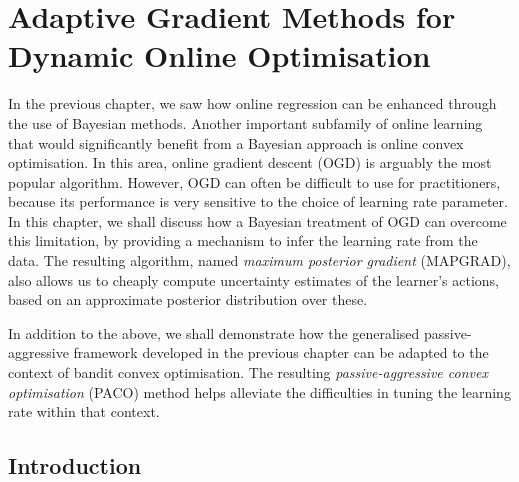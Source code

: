 \chapter{Adaptive Gradient Methods for Dynamic Online Optimisation}
\label{ch:oo}

\minitoc


In the previous chapter, we saw how online regression can be enhanced through the use of Bayesian methods. Another important subfamily of online learning that would significantly benefit from a Bayesian approach is online convex optimisation. In this area, online gradient descent (OGD) is arguably the most popular algorithm. However, OGD can often be difficult to use for practitioners, because its performance is very sensitive to the choice of learning rate parameter. In this chapter, we shall discuss how a Bayesian treatment of OGD can overcome this limitation, by providing a mechanism to infer the learning rate from the data. The resulting algorithm, named \emph{maximum posterior gradient} (MAPGRAD), also allows us to cheaply compute uncertainty estimates of the learner's actions, based on an approximate posterior distribution over these. 

In addition to the above, we shall demonstrate how the generalised passive-aggressive framework developed in the previous chapter can be adapted to the context of bandit convex optimisation. The resulting \emph{passive-aggressive convex optimisation} (PACO) method helps alleviate the difficulties in tuning the learning rate within that context.


\section{Introduction}
\label{sec:intro}

